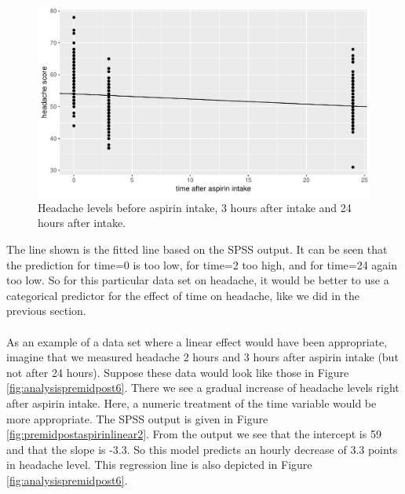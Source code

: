 \documentclass[]{book}\usepackage[]{graphicx}\usepackage[]{color}
\makeatletter
\def\maxwidth{ %
  \ifdim\Gin@nat@width>\linewidth
    \linewidth
  \else
    \Gin@nat@width
  \fi
}
\newenvironment{knitrout}{}{} %
\makeatother
\begin{document}
\begin{knitrout}
\color{fgcolor}\begin{figure}

{\centering \includegraphics[width=\maxwidth]{figure/analysispremidpost5-1} 

}

\caption[Headache levels before aspirin intake, 3 hours after intake and 24 hours after intake]{Headache levels before aspirin intake, 3 hours after intake and 24 hours after intake.}\label{fig:analysispremidpost5}
\end{figure}


\end{knitrout}

The line shown is the fitted line based on the SPSS output. It can be seen that the prediction for time=0 is too low, for time=2 too high, and for time=24 again too low. So for this particular data set on headache, it would be better to use a categorical predictor for the effect of time on headache, like we did in the previous section.
\\
\\
As an example of a data set where a linear effect would have been appropriate, imagine that we measured headache 2 hours and 3 hours after aspirin intake (but not after 24 hours). Suppose these data would look like those in Figure \ref{fig:analysispremidpost6}. There we see a gradual increase of headache levels right after aspirin intake. Here, a numeric treatment of the time variable would be more appropriate. The SPSS output is given in Figure \ref{fig:premidpostaspirinlinear2}. From the output we see that the intercept is 59 and that the slope is -3.3. So this model predicts an hourly decrease of 3.3 points in headache level. This regression line is also depicted in Figure \ref{fig:analysispremidpost6}. 
\end{document}
